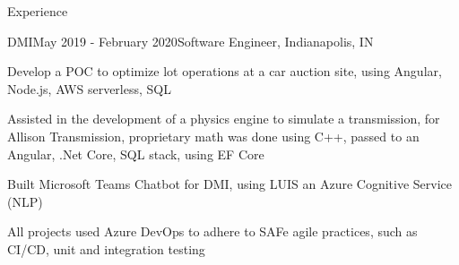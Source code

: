 \documentclass{resume} %
\begin{document}
\begin{rSection}{Experience}
\begin{rSubsection}{DMI}{May 2019 - February 2020}{Software Engineer, Indianapolis, IN}
\item Develop a POC to optimize lot operations at a car auction site, using Angular, Node.js, AWS serverless, SQL
\item Assisted in the development of a physics engine to simulate a transmission, for Allison Transmission, proprietary math was done using C++, passed to an Angular, .Net Core, SQL stack, using EF Core
\item Built Microsoft Teams Chatbot for DMI, using LUIS an Azure Cognitive Service (NLP)
\item All projects used Azure DevOps to adhere to SAFe agile practices, such as CI/CD, unit and integration testing
\end{rSubsection}
\end{rSection}


\end{document}
